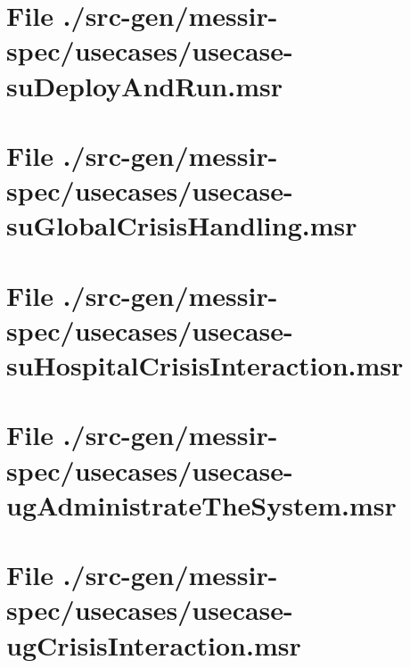 \section[File /src-gen/messir-spec/usecases/usecase-suDeployAndRun.msr]{File ./src-gen/messir-spec/usecases/usecase-suDeployAndRun.msr}
\scriptsize

\normalsize
	
\section[File /src-gen/messir-spec/usecases/usecase-suGlobalCrisisHandling.msr]{File ./src-gen/messir-spec/usecases/usecase-suGlobalCrisisHandling.msr}
\scriptsize

\normalsize
	
\section[File /src-gen/messir-spec/usecases/usecase-suHospitalCrisisInteraction.msr]{File ./src-gen/messir-spec/usecases/usecase-suHospitalCrisisInteraction.msr}
\scriptsize

\normalsize
	
\section[File /src-gen/messir-spec/usecases/usecase-ugAdministrateTheSystem.msr]{File ./src-gen/messir-spec/usecases/usecase-ugAdministrateTheSystem.msr}
\scriptsize

\normalsize
	
\section[File /src-gen/messir-spec/usecases/usecase-ugCrisisInteraction.msr]{File ./src-gen/messir-spec/usecases/usecase-ugCrisisInteraction.msr}
\scriptsize

\normalsize
	
